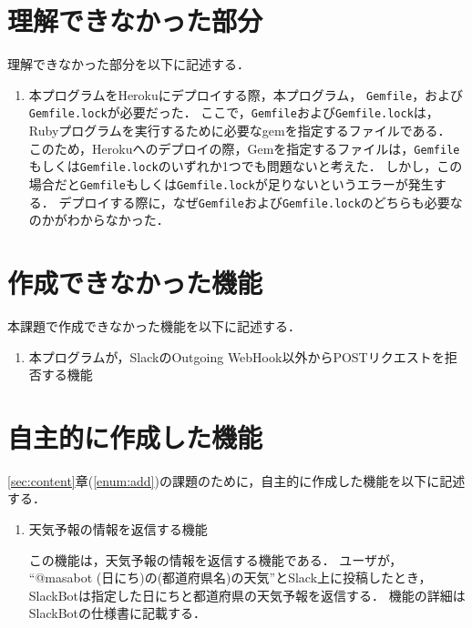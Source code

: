 \documentclass[12pt]{jsarticle}
\begin{document}
\section{理解できなかった部分}
理解できなかった部分を以下に記述する．
\begin{enumerate}
\item 本プログラムをHerokuにデプロイする際，本プログラム，%
  \verb|Gemfile|，および\verb|Gemfile.lock|が必要だった．
  ここで，\verb|Gemfile|および\verb|Gemfile.lock|は，Rubyプログラムを実行するために必要なgemを指定するファイルである．
  このため，Herokuへのデプロイの際，Gemを指定するファイルは，\verb|Gemfile|もしくは\verb|Gemfile.lock|のいずれか1つでも問題ないと考えた．
  しかし，この場合だと\verb|Gemfile|もしくは\verb|Gemfile.lock|が足りないというエラーが発生する．
  デプロイする際に，なぜ\verb|Gemfile|および\verb|Gemfile.lock|のどちらも必要なのかがわからなかった．
  

\end{enumerate}


\section{作成できなかった機能}
本課題で作成できなかった機能を以下に記述する．
\begin{enumerate}
\item 本プログラムが，SlackのOutgoing WebHook以外からPOSTリクエストを拒否する機能

  
\end{enumerate}

\section{自主的に作成した機能}
\ref{sec:content}章(\ref{enum:add})の課題のために，自主的に作成した機能を以下に記述する．
\begin{enumerate}
  \item 天気予報の情報を返信する機能

    この機能は，天気予報の情報を返信する機能である．
    ユーザが， ``@masabot (日にち)の(都道府県名)の天気''とSlack上に投稿したとき，SlackBotは指定した日にちと都道府県の天気予報を返信する．
    機能の詳細はSlackBotの仕様書に記載する．
\end{enumerate}




\end{document}
